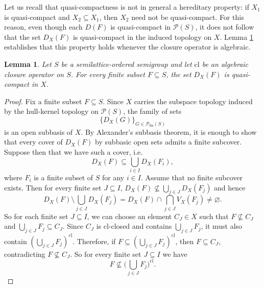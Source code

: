 \documentclass[10pt,a4paper]{amsart}
\newtheorem{lemma}[theorem]{Lemma}
\begin{document}
Let us recall that quasi-compactness is not in general a hereditary property: if $X_1$ is quasi-compact and $X_2 \subseteq X_1$, then $X_2$ need not be quasi-compact. For this reason, even though each $D(F)$ is quasi-compact in $\mathcal{P}(S)$, it does not follow that the set $D_X(F)$ is quasi-compact in the induced topology on $X$. Lemma \ref{quasi_compactness_of_subbasic_opens} establishes that this property holds whenever the closure operator is algebraic.  
\begin{lemma}\label{quasi_compactness_of_subbasic_opens}
    Let $S$ be a semilattice-ordered semigroup and let $\mathrm{cl}$ be an algebraic closure operator on $S$. For every finite subset $F \subseteq S$, the set $D_X(F)$ is quasi-compact in $X$. 
\end{lemma}
\begin{proof}
    Fix a finite subset $F \subseteq S$. Since $X$ carries the subspace topology induced by the hull-kernel topology on $\mathcal{P}(S)$, the family of sets $$\{D_X(G)\}_{G\in\mathcal{P}_\mathrm{fin}(S)}$$ is an open subbasis of $X$. By Alexander's subbasis theorem, it is enough to show that every cover of $D_X(F)$ by subbasic open sets admits a finite subcover. Suppose then that we have such a cover, i.e.
    \begin{equation}\label{cover_by_subbasic_opens}
        D_X(F) \subseteq \bigcup_{i\in I} D_X(F_i),  
    \end{equation}
    where $F_i$ is a finite subset of $S$ for any $i\in I$. 
    Assume that no finite subcover exists. Then for every finite set $J \subseteq I$, $D_X(F) \nsubseteq \bigcup_{j \in J}D_X(F_j)$ and hence 
    \begin{equation*}
        D_X(F) \setminus\bigcup_{j \in J} D_X(F_j) = D_X(F) \cap \bigcap_{j \in J} V_X(F_j) \neq \varnothing. 
    \end{equation*}
    So for each finite set $J \subseteq I$, we can choose an element $C_J \in X$ such that $F \nsubseteq C_J$ and $\bigcup_{j \in J} F_j \subseteq C_J$. Since $C_J$ is $\mathrm{cl}$-closed and contains $\bigcup_{j\in J}F_j$, it must also contain $(\bigcup_{j \in J} F_j)^{\mathrm{cl}}$. Therefore, if $F \subseteq (\bigcup_{j \in J} F_j)^{\mathrm{cl}}$, then $F\subseteq C_J$, contradicting $F \nsubseteq C_J$. So for every finite set $J \subseteq I$ we have 
    \begin{equation}\label{F_is_not_contained_in_cl_of_finite_sum} 
    F \nsubseteq \Big(\bigcup_{j \in J} F_j\Big)^{\mathrm{cl}}.
    \end{equation}
    

\end{proof}
\end{document}
